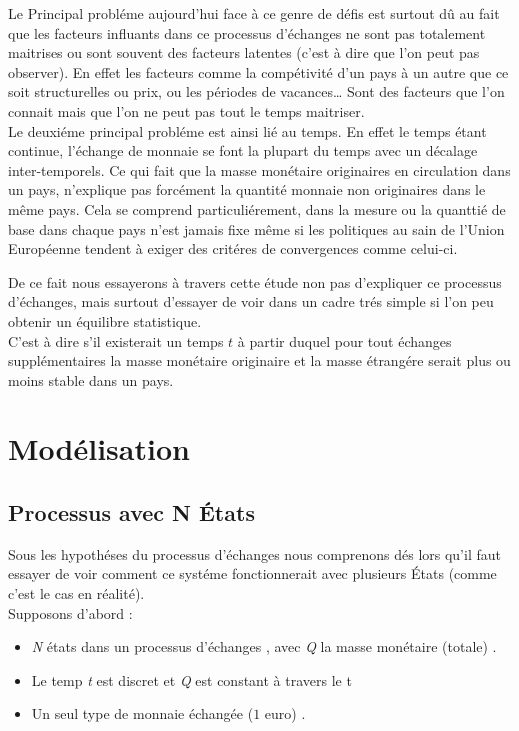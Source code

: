 \documentclass[11pt,]{article}
\begin{document}
Le Principal probléme aujourd'hui face à ce genre de défis est surtout
dû au fait que les facteurs influants dans ce processus d'échanges ne
sont pas totalement maitrises ou sont souvent des facteurs latentes
(c'est à dire que l'on peut pas observer). En effet les facteurs comme
la compétivité d'un pays à un autre que ce soit structurelles ou prix,
ou les périodes de vacances\ldots{} Sont des facteurs que l'on connait
mais que l'on ne peut pas tout le temps maitriser.\\
Le deuxiéme principal probléme est ainsi lié au temps. En effet le temps
étant continue, l'échange de monnaie se font la plupart du temps avec un
décalage inter-temporels. Ce qui fait que la masse monétaire originaires
en circulation dans un pays, n'explique pas forcément la quantité
monnaie non originaires dans le même pays. Cela se comprend
particuliérement, dans la mesure ou la quanttié de base dans chaque pays
n'est jamais fixe même si les politiques au sain de l'Union Européenne
tendent à exiger des critéres de convergences comme celui-ci.

De ce fait nous essayerons à travers cette étude non pas d'expliquer ce
processus d'échanges, mais surtout d'essayer de voir dans un cadre trés
simple si l'on peu obtenir un équilibre statistique.\\
C'est à dire s'il existerait un temps \(t\) à partir duquel pour tout
échanges supplémentaires la masse monétaire originaire et la masse
étrangére serait plus ou moins stable dans un pays.

\newpage

\section{Modélisation}\label{modelisation}

\subsection{Processus avec N États}\label{processus-avec-n-etats}

Sous les hypothéses du processus d'échanges nous comprenons dés lors
qu'il faut essayer de voir comment ce systéme fonctionnerait avec
plusieurs États (comme c'est le cas en réalité).\\
Supposons d'abord :

\begin{itemize}
\item
  \emph{N} états dans un processus d'échanges , avec \emph{Q} la masse
  monétaire (totale) .
\item
  Le temp \emph{t} est discret et \emph{Q} est constant à travers le t
\item
  Un seul type de monnaie échangée (\(1\) euro) .
\end{itemize}
\end{document}
